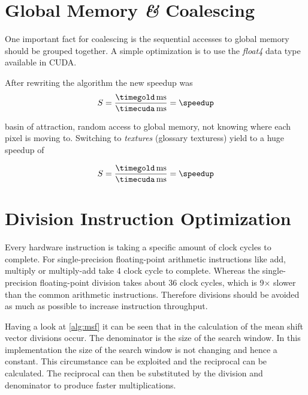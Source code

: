 \section*{Global Memory \textit{\&} Coalescing} 
\label{sec:coalescing}
One important fact for coalescing is the sequential accesses to global memory
should be grouped together. A simple optimization is to use the \emph{float4}
data type available in \gls{CUDA}. 

After rewriting the algorithm the new speedup
was 
\fpDiv{\speedup}{\timegold}{\timecuda}
\begin{equation*}\label{eq:speedup1}
	S = \frac{\unit[\timegold]{ms}}{\unit[\timecuda]{ms}} = \speedup
\end{equation*}

basin of attraction, random access to global memory, not knowing where each pixel
is moving to. Switching to \emph{textures} (glossary texturess) yield to a huge
speedup of 

\fpDiv{\speedup}{\timegold}{\timecuda}
\begin{equation*}\label{eq:speedup2}
	S = \frac{\unit[\timegold]{ms}}{\unit[\timecuda]{ms}} = \speedup
\end{equation*}


\section*{Division Instruction Optimization}
\label{sec:expensive_divisions}
Every hardware instruction is taking a specific amount of clock cycles to complete. 
For single-precision floating-point arithmetic instructions like add, multiply
or multiply-add take 4 clock cycle to complete. Whereas the single-precision
floating-point division takes about 36 clock cycles, which is 9$\times$ slower 
than the common arithmetic instructions. Therefore divisions should be avoided
as much as possible to increase instruction throughput. 


Having a look at \autoref{alg:msf} it can be seen that in the calculation of the
mean shift vector divisions occur. The denominator is the size of the search
window. In this implementation the size of the search window is not changing and
hence a constant. This circumstance can be exploited and the reciprocal can be
calculated. The reciprocal can then be substituted by the division and denominator
to produce faster multiplications.

